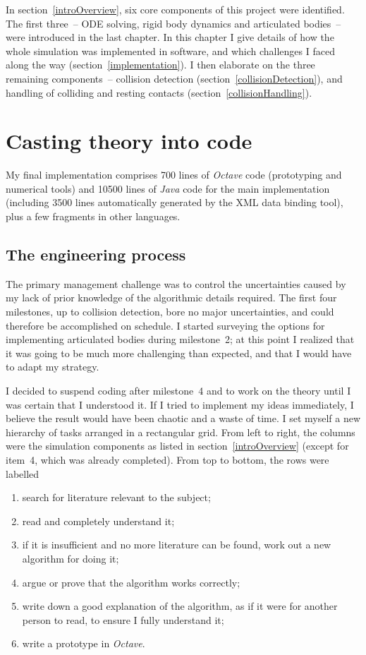 In section~\ref{introOverview}, six core components of this project were identified. The first
three~-- ODE solving, rigid body dynamics and articulated bodies~-- were introduced in the last
chapter. In this chapter I give details of how the whole simulation was implemented in software,
and which challenges I faced along the way (section~\ref{implementation}). I then elaborate on
the three remaining components~-- collision detection (section~\ref{collisionDetection}), and
handling of colliding and resting contacts (section~\ref{collisionHandling}).


\section{Casting theory into code\label{implementation}}

My final implementation comprises 700 lines of \textsl{Octave} code (prototyping and numerical
tools) and 10500 lines of \textsl{Java} code for the main implementation (including 3500 lines
automatically generated by the XML data binding tool), plus a few fragments in other languages.

\subsection{The engineering process\label{engineering}}

The primary management challenge was to control the uncertainties caused by my lack of prior
knowledge of the algorithmic details required. The first four milestones, up to collision
detection, bore no major uncertainties, and could therefore be accomplished on schedule. I started
surveying the options for implementing articulated bodies during milestone~2; at this point I
realized that it was going to be much more challenging than expected, and that I would have to
adapt my strategy.

I decided to suspend coding after milestone~4 and to work on the theory until I was certain that
I understood it. If I tried to implement my ideas immediately, I believe the result would have
been chaotic and a waste of time. I set myself a new hierarchy of tasks arranged in a rectangular
grid. From left to right, the columns were the simulation components as listed in
section~\ref{introOverview} (except for item~4, which was already completed). From top to bottom,
the rows were labelled
\begin{enumerate}
\item search for literature relevant to the subject;
\item read and completely understand it;
\item if it is insufficient and no more literature can be found, work out a new algorithm for
    doing it;
\item argue or prove that the algorithm works correctly;
\item write down a good explanation of the algorithm, as if it were for another person to read, to
    ensure I fully understand it;
\item write a prototype in \textsl{Octave}.
\end{enumerate}

